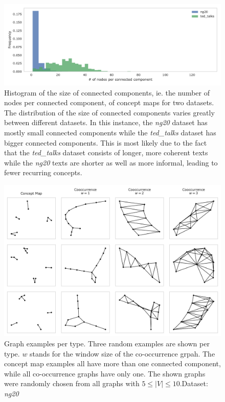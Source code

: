 \begin{figure}[htb!]
	\centering
	\includegraphics[width=0.9\linewidth]{assets/figures/connected_component_size_comparison.pdf}
	\caption[Statistics: Histogram of size of connectec components]{Histogram of the size of connected components, ie. the number of nodes per connected component, of concept maps for two datasets. The distribution of the size of connected components varies greatly between different datasets. In this instance, the \textit{ng20} dataset has mostly small connected components while the \textit{ted\_talks} dataset has bigger connected components. This is most likely due to the fact that the \textit{ted\_talks} dataset consists of longer, more coherent texts while the \textit{ng20} texts are shorter as well as more informal, leading to fewer recurring concepts.}
	\label{fig:histogram_connected_component_size}
\end{figure}

\begin{figure}[htb!]
\centering
\includegraphics[width=0.7\linewidth]{assets/figures/examples_graphs.pdf}
\caption[Examples: Graph types]{Graph examples per type. Three random examples are shown per type. $w$ stands for the window size of the co-occurrence grpah. The concept map examples all have more than one connected component, while all co-occurrence graphs have only one. The shown graphs were randomly chosen from all graphs with $5 \leq |V| \leq 10$.Dataset: \textit{ng20}}\label{fig:graph_examples}
\end{figure}

